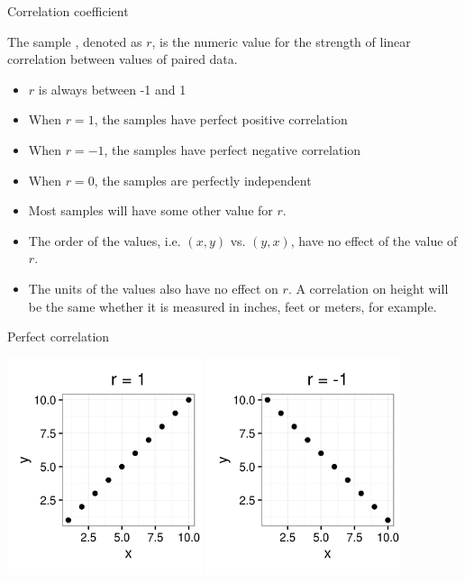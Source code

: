 \documentclass[xcolor=table]{beamer}
\begin{document}
\begin{frame}{Correlation coefficient}
\begin{block}{}
\large
The sample , denoted as $r$, is the numeric value for the strength of linear correlation between values of paired data.
\begin{itemize}
\pause\item $r$ is always between -1 and 1
\pause\item When $r=1$, the samples have perfect positive correlation
\pause\item When $r=-1$, the samples have perfect negative correlation
\pause\item When $r=0$, the samples are perfectly independent
\pause\item Most samples will have some other value for $r$. 
\pause\item The order of the values, i.e. $(x,y)$ vs. $(y,x)$, have no effect of the value of $r$.
\pause\item The units of the values also have no effect on $r$. A correlation on height will be the same whether it is measured in inches, feet or meters, for example.
\end{itemize}
\end{block}


\end{frame}

\begin{frame}{Perfect correlation}

{\centering
\includegraphics[width=2.25in]{../images/ch10_cor_pos1}
\includegraphics[width=2.25in]{../images/ch10_cor_neg1}
\par}
\end{frame}
\end{document}
